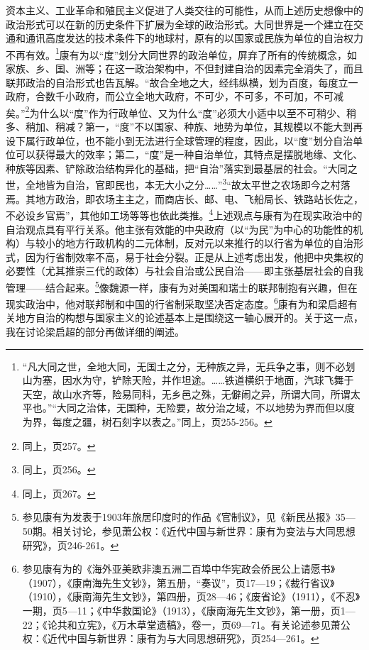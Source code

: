 \documentclass[a4paper, 12pt, openright]{ctexbook}
\begin{document}
资本主义、工业革命和殖民主义促进了人类交往的可能性，从而上述历史想像中的政治形式可以在新的历史条件下扩展为全球的政治形式。大同世界是一个建立在交通和通讯高度发达的技术条件下的地球村，原有的以国家或民族为单位的自治权力不再有效。\footnote{“凡大同之世，全地大同，无国土之分，无种族之异，无兵争之事，则不必划山为塞，因水为守，铲除天险，并作坦途。……铁道横织于地面，汽球飞舞于天空，故山水齐等，险易同科，无乡邑之殊，无僻闹之异，所谓大同，所谓太平也。”“大同之治体，无国种，无险要，故分治之域，不以地势为界而但以度为界，每度之疆，树石刻字以表之。”同上，页255-256。}康有为以“度”划分大同世界的政治单位，屏弃了所有的传统概念，如家族、乡、国、洲等；在这一政治架构中，不但封建自治的因素完全消失了，而且联邦政治的自治形式也告瓦解。“故合全地之大，经纬纵横，划为百度，每度立一政府，合数千小政府，而公立全地大政府，不可少，不可多，不可加，不可减矣。”\footnote{同上，页257。}为什么以“度”作为行政单位、又为什么“度”必须大小适中以至不可稍少、稍多、稍加、稍减？第一，“度”不以国家、种族、地势为单位，其规模以不能大到再设下属行政单位，也不能小到无法进行全球管理的程度，因此，以“度”划分自治单位可以获得最大的效率；第二，“度”是一种自治单位，其特点是摆脱地缘、文化、种族等因素、铲除政治结构异化的基础，把“自治”落实到最基层的社会。“大同之世，全地皆为自治，官即民也，本无大小之分……”\footnote{同上，页256。}“故太平世之农场即今之村落焉。其地方政治，即农场主主之，而商店长、邮、电、飞船局长、铁路站长佐之，不必设乡官焉”，其他如工场等等也依此类推。\footnote{同上，页267。}上述观点与康有为在现实政治中的自治观点具有平行关系。他主张有效能的中央政府（以“为民”为中心的功能性的机构）与较小的地方行政机构的二元体制，反对元以来推行的以行省为单位的自治形式，因为行省制效率不高，易于社会分裂。正是从上述考虑出发，他把中央集权的必要性（尤其推崇三代的政体）与社会自治或公民自治——即主张基层社会的自我管理——结合起来。\footnote{参见康有为发表于1903年旅居印度时的作品《官制议》，见《新民丛报》35—50期。相关讨论，参见萧公权：《近代中国与新世界：康有为变法与大同思想研究》，页246-261。}像魏源一样，康有为对美国和瑞士的联邦制抱有兴趣，但在现实政治中，他对联邦制和中国的行省制采取坚决否定态度。\footnote{参见康有为的《海外亚美欧非澳五洲二百埠中华宪政会侨民公上请愿书》（1907），《康南海先生文钞》，第五册，“奏议”，页17—19；《裁行省议》（1910），《康南海先生文钞》，第四册，页28—46；《废省论》（1911），《不忍》一期，页5—11；《中华救国论》（1913），《康南海先生文钞》，第一册，页1—22；《论共和立宪》，《万木草堂遗稿》，卷一，页69—71。有关论述参见萧公权：《近代中国与新世界：康有为与大同思想研究》，页254—261。}康有为和梁启超有关地方自治的构想与国家主义的论述基本上是围绕这一轴心展开的。关于这一点，我在讨论梁启超的部分再做详细的阐述。
\end{document}
